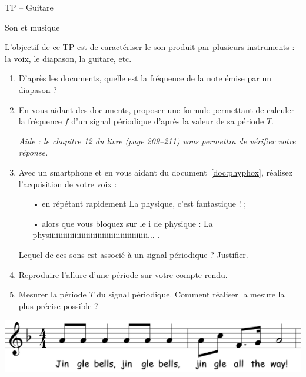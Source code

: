 \documentclass[12pt,a4paper]{article}
\begin{document}
\begin{header}
TP -- Guitare

Son et musique
\end{header}

L'objectif de ce TP est de caractériser le son produit par plusieurs instruments : la voix, le diapason, la guitare, etc.

\begin{enumerate}
\item \app{}
\label{quest:diapason}

D'après les documents, quelle est la fréquence de la note émise par un diapason ?

\item \app{}

En vous aidant des documents, proposer une formule permettant de calculer la fréquence $f$ d'un signal périodique d'après la valeur de sa période $T$.

\emph{Aide : le chapitre 12 du livre (page 209--211) vous permettra de vérifier votre réponse.}

\item \rea{} \anarai{}

Avec un smartphone et en vous aidant du document~\ref{doc:phyphox}, réalisez l'acquisition de votre voix : 
\begin{itemize}
\item[•] en répétant rapidement \og La physique, c'est fantastique !\fg{} ;
\item[•] alors que vous bloquez sur le \og i \fg{} de physique : \og La physiiiiiiiiiiiiiiiiiiiiiiiiiiiiiiiiiiiiiiiiiii... \fg{}.
\end{itemize}
Lequel de ces sons est associé à un signal périodique ?
Justifier.

\item \rea{}

Reproduire l'allure d'une période sur votre compte-rendu.

\item \rea{}

Mesurer la période $T$ du signal périodique.
Comment réaliser la mesure la plus précise possible ?
\end{enumerate}

\vfill

\begin{center}
\includegraphics[scale=0.35]{images/jingle_bells.png}
\end{center}
\end{document}
